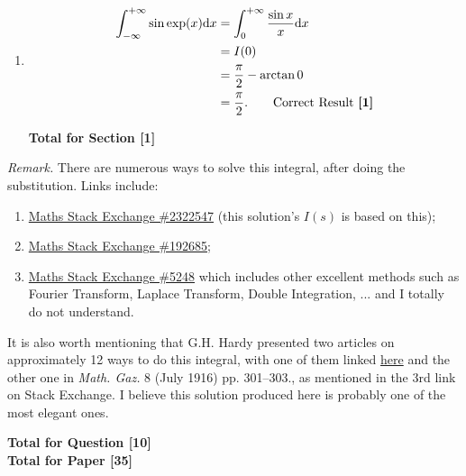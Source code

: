 \documentclass[12pt]{article}
\begin{document}
\begin{enumerate}
                \item
                    \begin{align*}
                         \int_{-\infty}^{+\infty} \sin \exp(x)  \mathrm{d} x &= \int_{0}^{+\infty} \frac{\sin x}{x} \mathrm{d}x\\
                         &= I(0)\\
                         &= \frac{\pi}{2} - \arctan{0}\\
                         &= \frac{\pi}{2}. \tag*{Correct Result \textbf{[1]}}
                    \end{align*}
                    
                    \hfill\textbf{Total for Section [1]}
            \end{enumerate}

            \textit{Remark.} There are numerous ways to solve this integral, after doing the substitution. Links include: 
            
            \begin{enumerate}
                \item \href{https://math.stackexchange.com/questions/2322547/improper-integral-of-sinx-x-from-zero-to-infinity}{Maths Stack Exchange \#2322547} (this solution's \(I(s)\) is based on this);
                \item \href{https://math.stackexchange.com/questions/192685/are-there-any-ways-to-evaluate-int-infty-0-frac-sin-xxdx-without-using-d}{Maths Stack Exchange \#192685};
                \item \href{https://math.stackexchange.com/questions/5248/evaluating-the-integral-int-0-infty-frac-sin-x-x-mathrm-dx-frac-pi}{Maths Stack Exchange \#5248} which includes other excellent methods such as  Fourier Transform, Laplace Transform, Double Integration, ... and I totally do not understand.
            \end{enumerate}
            
            It is also worth mentioning that G.H. Hardy presented two articles on approximately 12 ways to do this integral, with one of them linked \href{https://people.math.harvard.edu/~ctm/home/text/class/harvard/55b/10/html/home/hardy/sinx/sinx.pdf}{here} and the other one in \textit{Math. Gaz.} 8 (July 1916) pp. 301–303., as mentioned in the 3rd link on Stack Exchange. I believe this solution produced here is probably one of the most elegant ones.
            
            \hfill\textbf{Total for Question [10]}\\

        
        \hfill\textbf{Total for Paper [35]}
    
\end{document}
